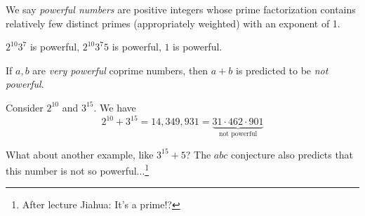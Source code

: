 \begin{conjecture}
    We say \emph{powerful numbers} are positive integers whose prime factorization contains relatively few distinct primes (appropriately weighted) with an exponent of 1.
    \begin{example*}
        $2^{10}3^7$ is powerful, $2^{10}3^{7}5$ is powerful, $1$ is powerful.
    \end{example*}

    If $a, b$ are \emph{very powerful} coprime numbers, then $a+b$ is predicted to be \emph{not powerful}.
\end{conjecture}
\begin{example}
    Consider $2^{10}$ and $3^{15}$. We have
    \[2^{10} + 3^{15} = 14,349,931 = \underbrace{31\cdot 462\cdot 901}_{\text{not powerful}}\]
\end{example}
What about another example, like $3^{15} + 5$? The $abc$ conjecture also predicts that this number is not so powerful...\footnote{After lecture Jiahua: It's a prime!?}